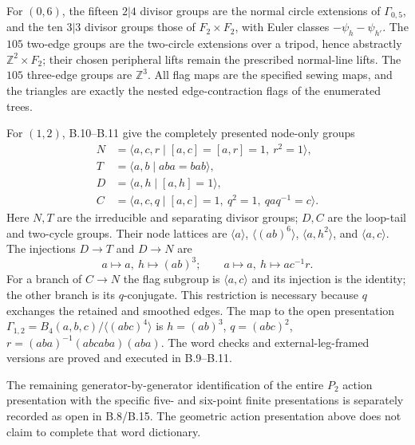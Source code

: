 For $(0,6)$, the fifteen $2|4$ divisor groups are the normal circle extensions of $\Gamma_{0,5}$, and the ten $3|3$ divisor groups those of $F_2\times F_2$, with Euler classes $-\psi_h-\psi_{h'}$. The $105$ two-edge groups are the two-circle extensions over a tripod, hence abstractly $\mathbb Z^2\times F_2$; their chosen peripheral lifts remain the prescribed normal-line lifts. The $105$ three-edge groups are $\mathbb Z^3$. All flag maps are the specified sewing maps, and the triangles are exactly the nested edge-contraction flags of the enumerated trees.

For $(1,2)$, B.10--B.11 give the completely presented node-only groups
\[
\begin{aligned}
 N&=\langle a,c,r\mid [a,c]=[a,r]=1,\ r^2=1\rangle,\\
 T&=\langle a,b\mid aba=bab\rangle,\\
 D&=\langle a,h\mid[a,h]=1\rangle,\\
 C&=\langle a,c,q\mid[a,c]=1,\ q^2=1,\ qaq^{-1}=c\rangle.
\end{aligned}
\]
Here $N,T$ are the irreducible and separating divisor groups; $D,C$ are the loop-tail and two-cycle groups. Their node lattices are $\langle a\rangle$, $\langle(ab)^6\rangle$, $\langle a,h^2\rangle$, and $\langle a,c\rangle$. The injections $D\to T$ and $D\to N$ are
\[
 a\mapsto a,\ h\mapsto(ab)^3;\qquad
 a\mapsto a,\ h\mapsto ac^{-1}r.
\]
For a branch of $C\to N$ the flag subgroup is $\langle a,c\rangle$ and its injection is the identity; the other branch is its $q$-conjugate. This restriction is necessary because $q$ exchanges the retained and smoothed edges. The map to the open presentation
$\Gamma_{1,2}=B_4(a,b,c)/\langle(abc)^4\rangle$
is
$h=(ab)^3$, $q=(abc)^2$, $r=(aba)^{-1}(abcaba)(aba)$.
The word checks and external-leg-framed versions are proved and executed in B.9--B.11.

The remaining generator-by-generator identification of the entire $P_2$ action presentation with the specific five- and six-point finite presentations is separately recorded as open in B.8/B.15. The geometric action presentation above does not claim to complete that word dictionary.
